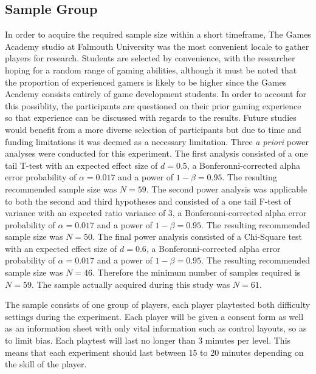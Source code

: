 \documentclass[journal]{IEEEtran}
\begin{document}
\subsection{Sample Group}
In order to acquire the required sample size within a short timeframe, The Games Academy studio at Falmouth University was the most convenient locale to gather players for research. Students are selected by convenience, with the researcher hoping for a random range of gaming abilities, although it must be noted that the proportion of experienced gamers is likely to be higher since the Games Academy consists entirely of game development students. In order to account for this possiblity, the participants are questioned on their prior gaming experience so that experience can be discussed with regards to the results. Future studies would benefit from a more diverse selection of participants but due to time and funding limitations it was deemed as a necessary limitation. Three \textit{a priori} power analyses were conducted for this experiment. The first analysis consisted of a one tail T-test with an expected effect size of $d = 0.5$, a Bonferonni-corrected \cite{weisstein2004bonferroni} alpha error probability of $\alpha = 0.017$ and a power of $1 - \beta = 0.95$. The resulting recommended sample size was $N = 59$. 
The second power analysis was applicable to both the second and third hypotheses and consisted of a one tail F-test of variance with an expected ratio variance of 3, a Bonferonni-corrected  alpha error probability of $\alpha = 0.017$ and a power of $1 - \beta = 0.95$. The resulting recommended sample size was $N = 50$.
The final power analysis consisted of a Chi-Square test with an expected effect size of $d = 0.6$, a Bonferonni-corrected alpha error probability of $\alpha = 0.017$ and a power of $1 - \beta = 0.95$. The resulting recommended sample size was $N = 46$. Therefore the minimum number of samples required is $N = 59$. The sample actually acquired during this study was $N = 61$. 

The sample consists of one group of players, each player playtested both difficulty settings during the experiment. Each player will be given a consent form as well as an information sheet with only vital information such as control layouts, so as to limit bias. Each playtest will last no longer than 3 minutes per level. This means that each experiment should last between 15 to 20 minutes depending on the skill of the player.
\end{document}
